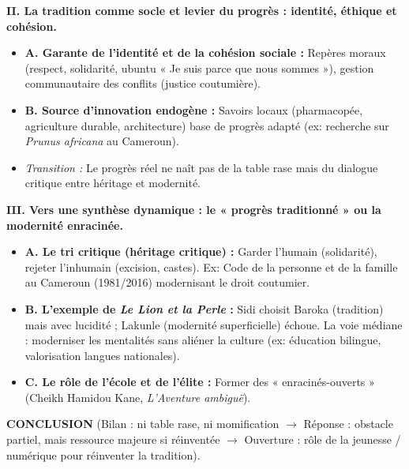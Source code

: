 \documentclass[11pt]{article}
\newcommand{\cle}[1]{{\popxbold\color{popdark}#1}}
\newcounter{popsec}
\newcounter{popsub}
\newcommand{\courssub}[1]{%
  \stepcounter{popsub}%
  \par\vspace{9pt}\noindent{\popxbold\fontsize{11.5}{13}\selectfont\color{popink}{\color{poporange}\thepopsec.\thepopsub}\hspace{6pt}#1}\par\nopagebreak\vspace{4pt}
}
\begin{document}
\begin{exoresolu}
\textbf{II. La tradition comme socle et levier du progrès : identité, éthique et cohésion.}
\begin{itemize}
    \item \textbf{A. Garante de l'identité et de la cohésion sociale :} Repères moraux (respect, solidarité, \cle{ubuntu} « Je suis parce que nous sommes »), gestion communautaire des conflits (justice coutumière).
    \item \textbf{B. Source d'innovation endogène :} Savoirs locaux (pharmacopée, agriculture durable, architecture) base de progrès adapté (ex: recherche sur \emph{Prunus africana} au Cameroun).
    \item \textit{Transition :} Le progrès réel ne naît pas de la table rase mais du dialogue critique entre héritage et modernité.
\end{itemize}

\textbf{III. Vers une synthèse dynamique : le « progrès traditionné » ou la modernité enracinée.}
\begin{itemize}
    \item \textbf{A. Le tri critique (héritage critique) :} Garder l'humain (solidarité), rejeter l'inhumain (excision, castes). Ex: Code de la personne et de la famille au Cameroun (1981/2016) modernisant le droit coutumier.
    \item \textbf{B. L'exemple de \emph{Le Lion et la Perle} :} Sidi choisit Baroka (tradition) mais avec lucidité ; Lakunle (modernité superficielle) échoue. La voie médiane : moderniser les mentalités sans aliéner la culture (ex: éducation bilingue, valorisation langues nationales).
    \item \textbf{C. Le rôle de l'école et de l'élite :} Former des « enracinés-ouverts » (Cheikh Hamidou Kane, \emph{L'Aventure ambiguë}).
\end{itemize}

\textbf{CONCLUSION} (Bilan : ni table rase, ni momification $\rightarrow$ Réponse : obstacle partiel, mais ressource majeure si réinventée $\rightarrow$ Ouverture : rôle de la jeunesse / numérique pour réinventer la tradition).
\end{exoresolu}

\courssub{Rédiger l'introduction}
\end{document}
